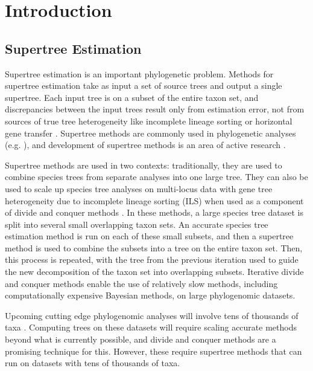 
\section{Introduction}
\subsection{Supertree Estimation}
Supertree estimation is an important phylogenetic problem. Methods for supertree estimation take as input a set of source trees and output a single supertree. Each input tree is on a subset of the entire taxon set, and discrepancies between the input trees result only from estimation error, not from sources of true tree heterogeneity like incomplete lineage sorting or horizontal gene transfer \cite{warnow2018supertree}. Supertree methods are commonly used in phylogenetic analyses (e.g. \cite{cisneros2019phylogenetic,mcmahon2006phylogenetic,wojciechowski2000molecular,kennedy2002seabird}), and development of supertree methods is an area of active research \cite{superfine,mrl,fastrfs,fleischauer2017bad}.

Supertree methods are used in two contexts: traditionally, they are used to combine species trees from separate analyses into one large tree. They can also be used to scale up species tree analyses on multi-locus data with gene tree heterogeneity due to incomplete lineage sorting (ILS) \cite{maddison1997gene} when used as a component of divide and conquer methods \cite{warnow2019divide, dactal}. In these methods, a large species tree dataset is split into several small overlapping taxon sets. An accurate species tree estimation method is run on each of these small subsets, and then a supertree method is used to combine the subsets into a tree on the entire taxon set. Then, this process is repeated, with the tree from the previous iteration used to guide the new decomposition of the taxon set into overlapping subsets. Iterative divide and conquer methods enable the use of relatively slow methods, including computationally expensive Bayesian methods, on large phylogenomic datasets.

Upcoming cutting edge phylogenomic analyses will involve tens of thousands of taxa \cite{koepfli2015genome, zhang2015genomics}. Computing trees on these datasets will require scaling accurate methods beyond what is currently possible, and divide and conquer methods are a promising technique for this. However, these require supertree methods that can run on datasets with tens of thousands of taxa. 

